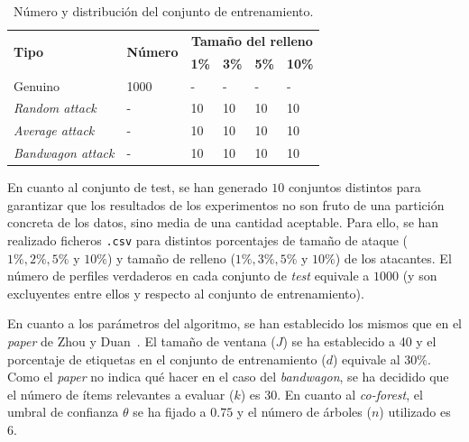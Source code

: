 \begin{table}
	\begin{centering}
		\begin{tabular}{@{} p{9em} p{7em} p{3em} p{3em} p{3em} p{3em} @{}}
			\toprule
			\multirow{2}{*}{\hfil \textbf{Tipo}} & \multirow{2}{*}{\hfil \textbf{Número}} & \multicolumn{4}{c}{\hfil \textbf{Tamaño del relleno}} \\ \cmidrule{3-6}
			&\hfil   &\hfil \textbf{1\%} &\hfil \textbf{3\%} & \hfil \textbf{5\%} & \hfil \textbf{10\%}\\ 
			\toprule
			Genuino &1000&\hfil -	& \hfil -  & \hfil - & \hfil -\\
			\textit{Random attack} &-	&\hfil 10 & \hfil 10	&  \hfil 10 & \hfil 10\\
			\textit{Average attack} &-	& \hfil 10 & \hfil 10 & \hfil 10 & \hfil 10 \\
			\textit{Bandwagon attack} &- & \hfil 10 & \hfil 10 & \hfil 10 & \hfil10 
			\\ \bottomrule
		\end{tabular}
	\end{centering}
	\caption[Sistemas de recomendación: descripción de los conjuntos]{Número y distribución del conjunto de entrenamiento.}
	\label{tbl:entrenamiento_ML10M}	
\end{table}

En cuanto al conjunto de test, se han generado $10$ conjuntos distintos para garantizar que los resultados de los experimentos no son fruto de una partición concreta de los datos, sino media de una cantidad aceptable. Para ello, se han realizado ficheros \texttt{.csv} para distintos porcentajes de tamaño de ataque ($1\%, 2\%, 5\%$ y $10\%$) y tamaño de relleno ($1\%, 3\%, 5\%$ y $10\%$) de los atacantes. El número de perfiles verdaderos en cada conjunto de \textit{test} equivale a $1000$ (y son excluyentes entre ellos y respecto al conjunto de entrenamiento).

En cuanto a los parámetros del algoritmo, se han establecido los mismos que en el \textit{paper} de Zhou y Duan~\cite{zhou2021SemisupervisedRecommendationAttack}. El tamaño de ventana ($J$) se ha establecido a 40 y el porcentaje de etiquetas en el conjunto de entrenamiento ($d$) equivale al $30\%$. Como el \textit{paper} no indica qué hacer en el caso del \textit{bandwagon}, se ha decidido que el número de ítems relevantes a evaluar ($k$) es 30. En cuanto al \textit{co-forest}, el umbral de confianza $\theta$ se ha fijado a $0$.$75$ y el número de árboles ($n$) utilizado es 6.


